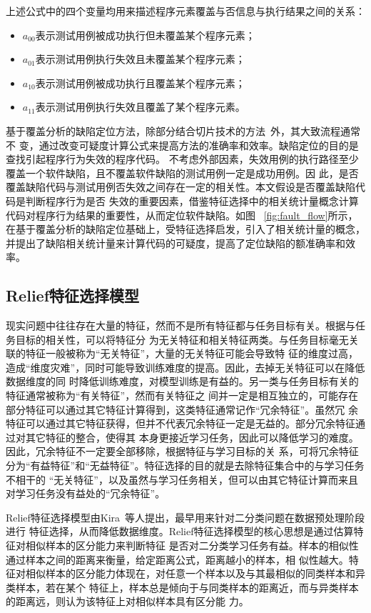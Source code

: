 上述公式中的四个变量均用来描述程序元素覆盖与否信息与执行结果之间的关系：
\begin{itemize}
  \item $a_{00}$表示测试用例被成功执行但未覆盖某个程序元素；
  \item $a_{01}$表示测试用例执行失效且未覆盖某个程序元素；
  \item $a_{10}$表示测试用例被成功执行且覆盖某个程序元素；
  \item $a_{11}$表示测试用例执行失效且覆盖了某个程序元素。
\end{itemize}

基于覆盖分析的缺陷定位方法，除部分结合切片技术的方法~\cite{conslice2013,wen2013}外，其大致流程通常不
变，通过改变可疑度计算公式来提高方法的准确率和效率。缺陷定位的目的是查找引起程序行为失效的程序代码。
不考虑外部因素，失效用例的执行路径至少覆盖一个软件缺陷，且不覆盖软件缺陷的测试用例一定是成功用例。因
此，是否覆盖缺陷代码与测试用例否失效之间存在一定的相关性。本文假设是否覆盖缺陷代码是判断程序行为是否
失效的重要因素，借鉴特征选择中的相关统计量概念计算代码对程序行为结果的重要性，从而定位软件缺陷。如图
~\ref{fig:fault_flow}所示，在基于覆盖分析的缺陷定位基础上，受特征选择启发，引入了相关统计量的概念，
并提出了缺陷相关统计量来计算代码的可疑度，提高了定位缺陷的额准确率和效率。

\subsection{Relief特征选择模型}
现实问题中往往存在大量的特征，然而不是所有特征都与任务目标有关。根据与任务目标的相关性，可以将特征分
为无关特征和相关特征两类。与任务目标毫无关联的特征一般被称为``无关特征''，大量的无关特征可能会导致特
征的维度过高，造成``维度灾难''，同时可能导致训练难度的提高。因此，去掉无关特征可以在降低数据维度的同
时降低训练难度，对模型训练是有益的。另一类与任务目标有关的特征通常被称为``有关特征''，然而有关特征之
间并一定是相互独立的，可能存在部分特征可以通过其它特征计算得到，这类特征通常记作``冗余特征''。虽然冗
余特征可以通过其它特征获得，但并不代表冗余特征一定是无益的。部分冗余特征通过对其它特征的整合，使得其
本身更接近学习任务，因此可以降低学习的难度。因此，冗余特征不一定要全部移除，根据特征与学习目标的关
系，可将冗余特征分为``有益特征''和``无益特征''。特征选择的目的就是去除特征集合中的与学习任务不相干的
``无关特征''，以及虽然与学习任务相关，但可以由其它特征计算而来且对学习任务没有益处的``冗余特征''。

Relief特征选择模型由Kira~\cite{kira1992feature}等人提出，最早用来针对二分类问题在数据预处理阶段进行
特征选择，从而降低数据维度。Relief特征选择模型的核心思想是通过估算特征对相似样本的区分能力来判断特征
是否对二分类学习任务有益。样本的相似性通过样本之间的距离来衡量，给定距离公式，距离越小的样本，相
似性越大。特征对相似样本的区分能力体现在，对任意一个样本以及与其最相似的同类样本和异类样本，若在某个
特征上，样本总是倾向于与同类样本的距离近，而与异类样本的距离远，则认为该特征上对相似样本具有区分能
力。

